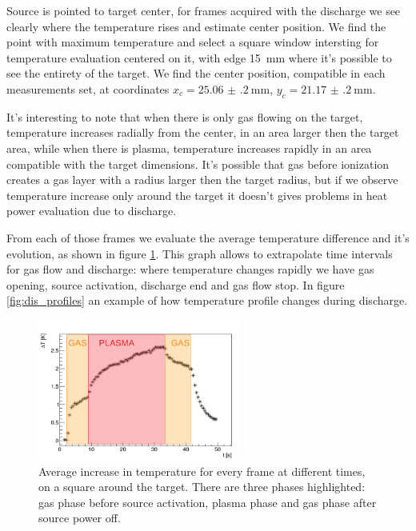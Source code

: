 Source is pointed to target center, for frames acquired with the discharge we see clearly where the temperature rises and estimate center position. We find the point with maximum temperature and select a square window intersting for temperature evaluation centered on it, with edge \SI{15}{\milli\meter} where it's possible to see the entirety of the target. We find the center position, compatible in each measurements set, at coordinates $x_{c} = \SI{25.06(20)}{\milli\meter}$, $y_{c} = \SI{21.17(20)}{\milli\meter}$.

It's interesting to note that when there is only gas flowing on the target, temperature increases radially from the center, in an area larger then the target area, while when there is plasma, temperature increases rapidly in an area compatible with the target dimensions. It's possible that gas before ionization creates a gas layer with a radius larger then the target radius, but if we observe temperature increase only around the target it doesn't gives problems in heat power evaluation due to discharge.

From each of those frames we evaluate the average temperature difference and it's evolution, as shown in figure \ref{fig:Tavg}. This graph allows to extrapolate time intervals for gas flow and discharge: where temperature changes rapidly we have gas opening, source activation, discharge end and gas flow stop. In figure \ref{fig:dis_profiles} an example of how temperature profile changes during discharge.
\begin{figure}
 \centering
 \includegraphics[width=0.6\textwidth]{Images/Temperature/f5t4d4_Tavg_lines.png}
 \caption{Average increase in temperature for every frame at different times, on a square around the target. There are three phases highlighted: gas phase before source activation, plasma phase and gas phase after source power off.}
 \label{fig:Tavg}
\end{figure}

